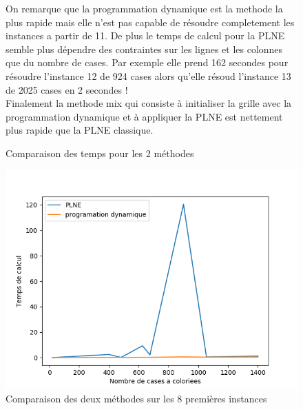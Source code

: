 \documentclass[a4paper]{memoir}
\begin{document}
\begin{figure}[h]
\begin{center}
\caption{Comparaison des temps pour les 2 méthodes}
  \end{center}
  On remarque que la programmation dynamique est la methode la plus rapide mais elle n'est pas capable de résoudre completement les instances a partir de 11. De plus le temps de calcul pour la PLNE semble plus dépendre des contraintes sur les lignes et les colonnes que du nombre de cases. Par exemple elle prend 162 secondes pour résoudre l'instance 12 de 924 cases alors qu'elle résoud l'instance 13 de 2025 cases en 2 secondes ! \\
  Finalement la methode mix qui consiste à initialiser la grille avec la programmation dynamique et à appliquer la PLNE est nettement plus rapide que la PLNE classique.
\end{figure}



\begin{figure}[h]
  \centering
  \includegraphics[width=0.75\linewidth]{../images/comparaison.png}
  \caption{Comparaison des deux méthodes sur les 8 premières instances}
  \label{fig:graphes-comparaison}
\end{figure}
\end{document}
